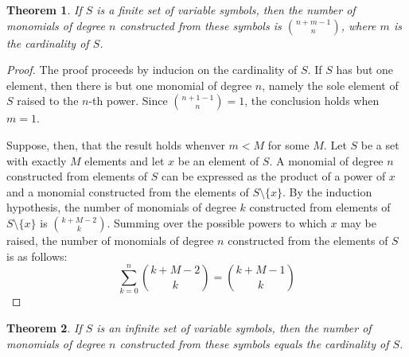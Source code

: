 \documentclass[12pt]{article}
\newtheorem{theorem}{Theorem}
\begin{document}
\begin{theorem}
If $S$ is a finite set of variable symbols, then the number of monomials of 
degree $n$ constructed from these symbols is ${n + m - 1 \choose n}$, where 
$m$ is the cardinality of $S$.
\end{theorem}

\begin{proof}
The proof proceeds by inducion on the cardinality of $S$.  If $S$ has but one
element, then there is but one monomial of degree $n$, namely the sole element
of $S$ raised to the $n$-th power.  Since ${n + 1 - 1 \choose n} = 1$, the 
conclusion holds when $m = 1$.

Suppose, then, that the result holds whenver $m < M$ for some $M$.  Let $S$ be
a set with exactly $M$ elements and let $x$ be an element of $S$.  A monomial
of degree $n$ constructed from elements of $S$ can be expressed as the product
of a power of $x$ and a monomial constructed from the elements of $S \setminus
\{x\}$.  By the induction hypothesis, the number of monomials of degree $k$ 
constructed from elements of $S \setminus \{x\}$ is ${k + M - 2 \choose k}$.
Summing over the possible powers to which $x$ may be raised, the number of
monomials of degree $n$ constructed from the elements of $S$ is as follows:
 \[ \sum_{k=0}^n {k + M - 2 \choose k} = {k + M - 1 \choose k} \]
\end{proof}

\begin{theorem}
If $S$ is an infinite set of variable symbols, then the number of monomials 
of degree $n$ constructed from these symbols equals the cardinality of $S$.
\end{theorem}

\end{document}
